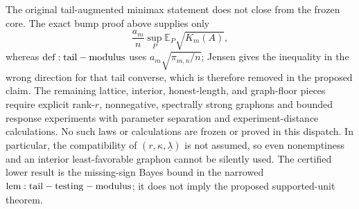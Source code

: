 The original tail-augmented minimax statement does not close from the frozen core.  The exact bump proof above supplies only
\[
 \frac{a_m}{n}\sup_P\mathbb E_P\sqrt{K_m(A)},
\]
whereas \({\rm def:tail-modulus}\) uses \(a_m\sqrt{\pi_{m,n}/n}\); Jensen gives the inequality in the wrong direction for that tail converse, which is therefore removed in the proposed claim.  The remaining lattice, interior, honest-length, and graph-floor pieces require explicit rank-\(r\), nonnegative, spectrally strong graphons and bounded response experiments with parameter separation and experiment-distance calculations.  No such laws or calculations are frozen or proved in this dispatch.  In particular, the compatibility of \((r,\kappa,\underline\lambda)\) is not assumed, so even nonemptiness and an interior least-favorable graphon cannot be silently used.  The certified lower result is the missing-sign Bayes bound in the narrowed \({\rm lem:tail-testing-modulus}\); it does not imply the proposed supported-unit theorem.